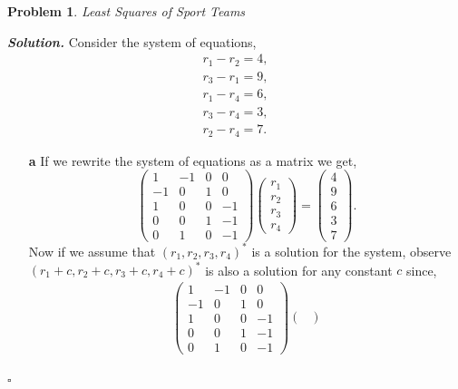 \documentclass[12pt]{report}
\newtheorem{problem}{Problem}
\newenvironment{solution}[1][\it{Solution}]{\textbf{#1. } }{$\square$}
\begin{document}
\newpage



\begin{problem}
    Least Squares of Sport Teams
\end{problem}

\begin{solution}
    \noindent
    Consider the system of equations,
    \begin{align*}
        r_1 - r_2 = 4,\\
        r_3 - r_1 = 9,\\
        r_1 - r_4 = 6,\\
        r_3 - r_4 = 3,\\
        r_2 - r_4 = 7.
    \end{align*}
    \begin{enumerate}
        \item [{\bf a}]
        If we rewrite the system of equations as a matrix we get,
        \[ \begin{pmatrix}1&-1&0&0\\-1&0&1&0\\1&0&0&-1\\0&0&1&-1\\0&1&0&-1\end{pmatrix}\begin{pmatrix}
            r_1\\r_2\\r_3\\r_4
        \end{pmatrix} = \begin{pmatrix}
            4\\9\\6\\3\\7
        \end{pmatrix}.\]
        Now if we assume that $(r_1,r_2,r_3,r_4)^*$ is a solution for the system, observe $(r_1 +c ,r_2 + c,r_3 + c,r_4 + c)^*$ is also a solution for any constant $c$ since,
        \begin{align*}
            \begin{pmatrix}1&-1&0&0\\-1&0&1&0\\1&0&0&-1\\0&0&1&-1\\0&1&0&-1\end{pmatrix}\begin{pmatrix}

\end{pmatrix}
\end{align*}
\end{enumerate}
\end{solution}
\end{document}
